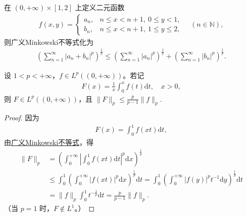 \documentclass[../../main.tex]{subfiles}%
\begin{document}
\begin{remark}
在 $(0,+\infty)\times[1,2]$ 上定义二元函数
\begin{align*}
f(x,y) =
\begin{cases}
a_n, & n\leqslant x<n+1,\ 0\leqslant y<1, \\
b_n, & n\leqslant x<n+1,\ 1\leqslant y\leqslant 2,
\end{cases}
\quad (n\in\mathbb{N}),
\end{align*}
则广义Minkowski不等式化为
\begin{align*}
\left( \sum_{n=1}^\infty |a_n + b_n|^p \right)^{\frac{1}{p}} \leqslant \left( \sum_{n=1}^\infty |a_n|^p \right)^{\frac{1}{p}} + \left( \sum_{n=1}^\infty |b_n|^p \right)^{\frac{1}{p}}.
\end{align*}
\end{remark}

\begin{example}
设 $1<p<+\infty$，$f\in L^p((0,+\infty))$。若记
\begin{align*}
F(x) = \frac{1}{x} \int_0^x f(t)\mathrm{d}t, \quad x>0,
\end{align*}
则 $F\in L^p((0,+\infty))$，且 $\|F\|_p \leqslant \frac{p}{p-1}\|f\|_p$.
\end{example}

\begin{proof}

因为
\begin{align*}
F(x) = \int_0^1 f(xt)\mathrm{d}t,
\end{align*}
由\hyperref[theorem:广义Minkowski不等式]{广义Minkowski不等式}，得
\begin{align*}
\|F\|_p &= \left( \int_0^{+\infty} \left| \int_0^1 f(xt)\mathrm{d}t \right|^p \mathrm{d}x \right)^{\frac{1}{p}} \\
&\leqslant \int_0^1 \left( \int_0^{+\infty} |f(xt)|^p \mathrm{d}x \right)^{\frac{1}{p}} \mathrm{d}t = \int_0^1 \left( \int_0^{+\infty} |f(y)|^p t^{-1} \mathrm{d}y \right)^{\frac{1}{p}} \mathrm{d}t \\
&= \|f\|_p \int_0^1 t^{-\frac{1}{p}} \mathrm{d}t = \frac{p}{p-1}\|f\|_p.
\end{align*}
（当 $p=1$ 时，$F\notin L^1$。）

\end{proof}
\end{document}
